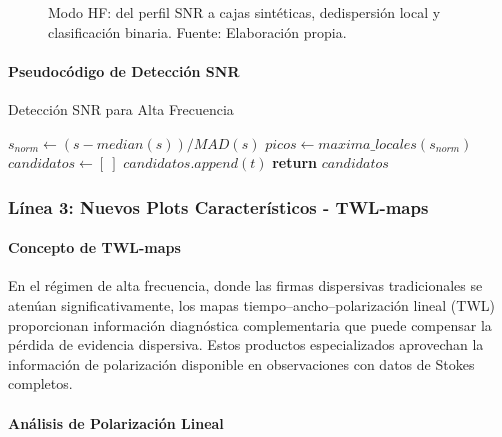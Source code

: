 \begin{figure}[H] 
\centering 
\caption{Modo HF: del perfil SNR a cajas sintéticas, dedispersión local y clasificación binaria. Fuente: Elaboración propia.}
\label{fig:hf} 
\end{figure}

\paragraph{Pseudocódigo de Detección SNR}

\begin{algorithm}[H]
\caption{Detección SNR para Alta Frecuencia}
\begin{algorithmic}[1]
    \State $s_{norm} \leftarrow (s - median(s)) / MAD(s)$
    \State $picos \leftarrow maxima\_locales(s_{norm})$
    \State $candidatos \leftarrow [\ ]$
            \State $candidatos.append(t)$
        \EndIf
    \EndFor
    \State \textbf{return} $candidatos$
\EndFunction
\end{algorithmic}
\end{algorithm}

\subsubsection{Línea 3: Nuevos Plots Característicos - TWL-maps}

\paragraph{Concepto de TWL-maps}

En el régimen de alta frecuencia, donde las firmas dispersivas tradicionales se atenúan significativamente, los mapas tiempo--ancho--polarización lineal (TWL) proporcionan información diagnóstica complementaria que puede compensar la pérdida de evidencia dispersiva. Estos productos especializados aprovechan la información de polarización disponible en observaciones con datos de Stokes completos.

\paragraph{Análisis de Polarización Lineal}

